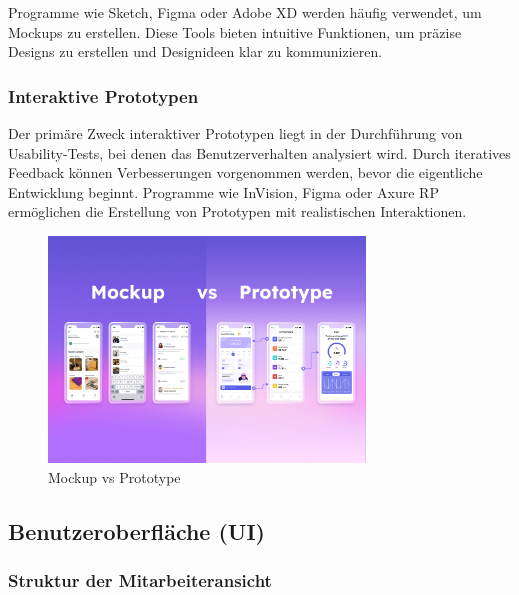 Programme wie Sketch, Figma oder Adobe XD werden häufig verwendet, um Mockups zu erstellen. Diese Tools bieten intuitive Funktionen, um präzise Designs zu erstellen und Designideen klar zu kommunizieren.

\newpage

\subsubsection{Interaktive Prototypen}
Der primäre Zweck interaktiver Prototypen liegt in der Durchführung von Usability-Tests, bei denen das Benutzerverhalten analysiert wird. Durch iteratives Feedback können Verbesserungen vorgenommen werden, bevor die eigentliche Entwicklung beginnt.
Programme wie InVision, Figma oder Axure RP ermöglichen die Erstellung von Prototypen mit realistischen Interaktionen.

\begin{figure}
	\centering
	\includegraphics[width=0.75\textwidth]{images/Mockup-vs-Prototype.jpg}
	\caption{Mockup vs Prototype \textit{\cite{mockup_vs_prototype_image}}}
\end{figure}

\newpage

\subsection{Benutzeroberfläche (UI)}

\subsubsection{Struktur der Mitarbeiteransicht}

